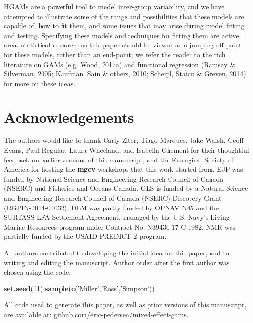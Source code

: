 \documentclass[12pt]{article}
\newenvironment{Shaded}{\begin{snugshade}}{\end{snugshade}}
\newcommand{\KeywordTok}[1]{\textcolor[rgb]{0.13,0.29,0.53}{\textbf{#1}}}
\newcommand{\DecValTok}[1]{\textcolor[rgb]{0.00,0.00,0.81}{#1}}
\newcommand{\StringTok}[1]{\textcolor[rgb]{0.31,0.60,0.02}{#1}}
\newcommand{\NormalTok}[1]{#1}
\begin{document}
HGAMs are a powerful tool to model inter-group variability, and we have
attempted to illustrate some of the range and possibilities that these
models are capable of, how to fit them, and some issues that may arise
during model fitting and testing. Specifying these models and techniques
for fitting them are active areas statistical research, so this paper
should be viewed as a jumping-off point for these models, rather than an
end-point; we refer the reader to the rich literature on GAMs (e.g.
Wood, 2017a) and functional regression (Ramsay \& Silverman, 2005;
Kaufman, Sain \& others, 2010; Scheipl, Staicu \& Greven, 2014) for more
on these ideas.

\section{Acknowledgements}\label{acknowledgements}

The authors would like to thank Carly Ziter, Tiago Marques, Jake Walsh,
Geoff Evans, Paul Regular, Laura Wheeland, and Isabella Ghement for
their thoughtful feedback on earlier versions of this manuscript, and
the Ecological Society of America for hosting the \textbf{mgcv}
workshops that this work started from. EJP was funded by National
Science and Engineering Research Council of Canada (NSERC) and Fisheries
and Oceans Canada. GLS is funded by a Natural Science and Engineering
Research Council of Canada (NSERC) Discovery Grant (RGPIN-2014-04032).
DLM was partly funded by OPNAV N45 and the SURTASS LFA Settlement
Agreement, managed by the U.S. Navy's Living Marine Resources program
under Contract No. N39430-17-C-1982. NMR was partially funded by the
USAID PREDICT-2 program.

All authors contributed to developing the initial idea for this paper,
and to writing and editing the manuscript. Author order after the first
author was chosen using the code:

\begin{Shaded}
\begin{Highlighting}[]
\KeywordTok{set.seed}\NormalTok{(}\DecValTok{11}\NormalTok{)}
\KeywordTok{sample}\NormalTok{(}\KeywordTok{c}\NormalTok{(}\StringTok{'Miller'}\NormalTok{,}\StringTok{'Ross'}\NormalTok{,}\StringTok{'Simpson'}\NormalTok{))}
\end{Highlighting}
\end{Shaded}

All code used to generate this paper, as well as prior versions of this
manuscript, are available at:
\href{https://github.com/eric-pedersen/mixed-effect-gams}{github.com/eric-pedersen/mixed-effect-gams}.
\end{document}
